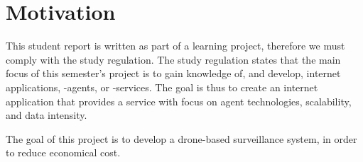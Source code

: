 \section{Motivation}
This student report is written as part of a learning project, therefore we must comply with the study regulation.
The study regulation states that the main focus of this semester’s project is to gain knowledge of, and develop, internet applications, -agents, or -services.
The goal is thus to create an internet application that provides a service with focus on agent technologies, scalability, and data intensity.

The goal of this project is to develop a drone-based surveillance system, in order to reduce economical cost.